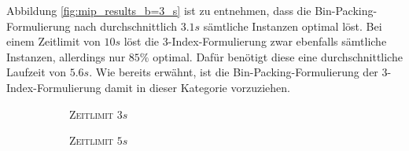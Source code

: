 Abbildung \ref{fig:mip_results_b=3_s} ist zu entnehmen, dass die Bin-Packing-Formulierung nach durchschnittlich
$3.1s$ sämtliche Instanzen optimal löst. Bei einem Zeitlimit von $10s$ löst die 3-Index-Formulierung zwar ebenfalls
sämtliche Instanzen, allerdings nur $85 \%$ optimal. Dafür benötigt diese eine durchschnittliche Laufzeit von
$5.6s$. Wie bereits erwähnt, ist die Bin-Packing-Formulierung der 3-Index-Formulierung damit in dieser Kategorie vorzuziehen.

\begin{figure}[H]
\centering
\begin{subfigure}[b]{0.3\textwidth}
\centering
{}
\caption{\textsc{Zeitlimit} $3s$}
\label{}
\end{subfigure}
\begin{subfigure}[b]{0.3\textwidth}
\centering
{}
\caption{\textsc{Zeitlimit} $5s$}
\label{}
\end{subfigure}
\begin{subfigure}[b]{0.3\textwidth}
\centering
{}
\end{subfigure}
\end{figure}
